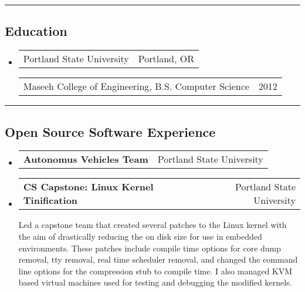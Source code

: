 \documentclass[10pt,letterpaper]{article}
\author{Eric Dinger}
\makeatletter
\newcommand{\heading}[2]
{\begin{tabular*}{\linewidth}{l@{\extracolsep{\fill}}r}
#1 &
#2 \\
\end{tabular*}}
\makeatother
\begin{document}
 \renewcommand*\arraystretch{1.5}


\vspace{.2em}
\hrule
\vspace{-.2em}

\subsection*{Education}
	\begin{itemize}
	\item
		\heading
			{Portland State University}
			{Portland, OR}
		\heading 
			{Maseeh College of Engineering, B.S. Computer Science}
			{2012}
	\end{itemize}

\hrule

\subsection*{Open Source Software Experience}
	\begin{itemize}
		\item 
		\heading
			{\textbf{Autonomus Vehicles Team}}
			{Portland State University}
		\item 
		\heading
			{\textbf{CS Capstone: Linux Kernel Tinification}}
			{Portland State University}
			Led a capstone team that created several patches to the Linux kernel with the aim of drastically reducing the on disk size for use in embedded environments. These 					patches include compile time options for core dump removal, tty removal, real time scheduler removal, and changed the command line options for the compression stub to 				compile time. I also managed KVM based virtual machines used for testing and debugging the modified kernels.
	\end{itemize}
\end{document}
